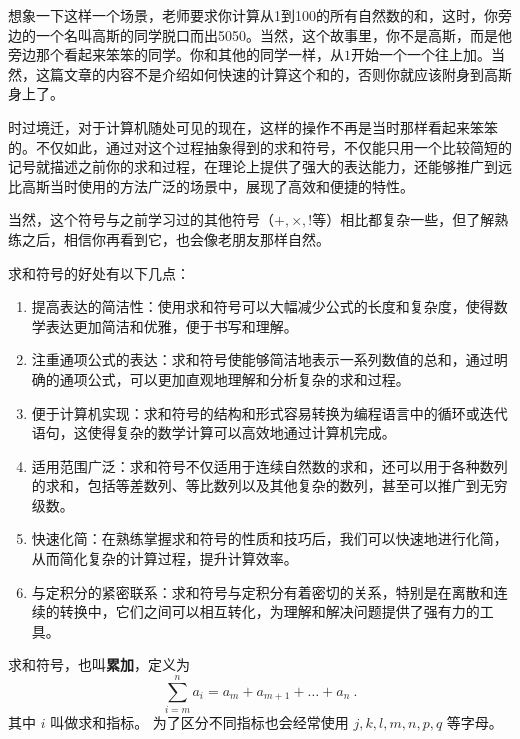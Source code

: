 
\begin{issues}
\issueDraft
\end{issues}

想象一下这样一个场景，老师要求你计算从1到100的所有自然数的和，这时，你旁边的一个名叫高斯的同学脱口而出5050。当然，这个故事里，你不是高斯，而是他旁边那个看起来笨笨的同学。你和其他的同学一样，从$1$开始一个一个往上加。当然，这篇文章的内容不是介绍如何快速的计算这个和的，否则你就应该附身到高斯身上了。

时过境迁，对于计算机随处可见的现在，这样的操作不再是当时那样看起来笨笨的。不仅如此，通过对这个过程抽象得到的求和符号，不仅能只用一个比较简短的记号就描述之前你的求和过程，在理论上提供了强大的表达能力，还能够推广到远比高斯当时使用的方法广泛的场景中，展现了高效和便捷的特性。

当然，这个符号与之前学习过的其他符号（$+,\times,!$等）相比都复杂一些，但了解熟练之后，相信你再看到它，也会像老朋友那样自然。

求和符号的好处有以下几点：
\begin{enumerate}
\item 提高表达的简洁性：使用求和符号可以大幅减少公式的长度和复杂度，使得数学表达更加简洁和优雅，便于书写和理解。
\item 注重通项公式的表达：求和符号使能够简洁地表示一系列数值的总和，通过明确的通项公式，可以更加直观地理解和分析复杂的求和过程。
\item 便于计算机实现：求和符号的结构和形式容易转换为编程语言中的循环或迭代语句，这使得复杂的数学计算可以高效地通过计算机完成。
\item 适用范围广泛：求和符号不仅适用于连续自然数的求和，还可以用于各种数列的求和，包括等差数列、等比数列以及其他复杂的数列，甚至可以推广到无穷级数。
\item 快速化简：在熟练掌握求和符号的性质和技巧后，我们可以快速地进行化简，从而简化复杂的计算过程，提升计算效率。
\item 与定积分的紧密联系：求和符号与定积分有着密切的关系，特别是在离散和连续的转换中，它们之间可以相互转化，为理解和解决问题提供了强有力的工具。
\end{enumerate}



求和符号，也叫\textbf{累加}，定义为
\begin{equation}
\sum_{i=m}^n a_i = a_m + a_{m+1} + \dots + a_n~.
\end{equation}
其中 $i$ 叫做求和指标。 为了区分不同指标也会经常使用 $j,k,l,m,n,p,q$ 等字母。

